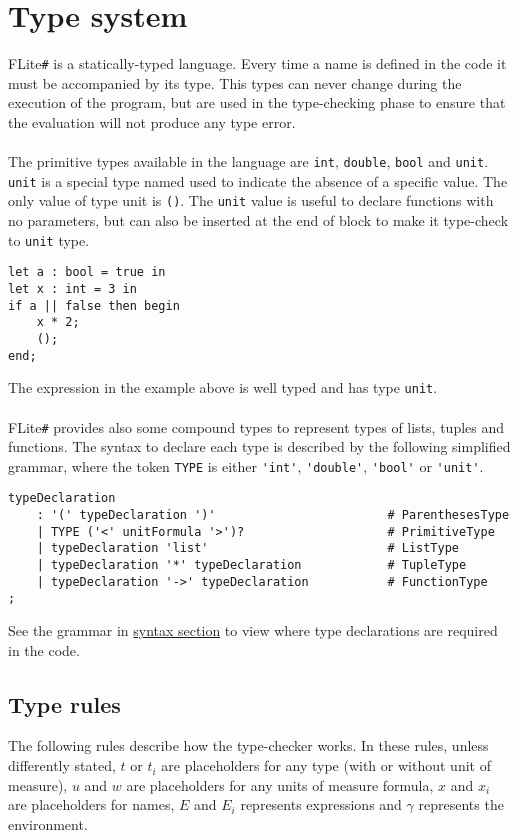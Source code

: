 \documentclass[]{article}
\begin{document}
	\section{Type system}
	\label{sec:typeSystem}
		FLite\verb|#| is a statically-typed language. Every time a name is defined in the code it must be accompanied by its type. This types can never change during the execution of the program, but are used in the type-checking phase to ensure that the evaluation will not produce any type error.\\\\
		The primitive types available in the language are \lstinline|int|, \lstinline|double|, \lstinline|bool| and \lstinline|unit|. \lstinline|unit| is a special type named used to indicate the absence of a specific value. The only value of type unit is \lstinline|()|. The \lstinline|unit| value is useful to declare functions with no parameters, but can also be inserted at the end of block to make it type-check to \lstinline|unit| type.
		\begin{lstlisting}[caption={Conditional expression}, label=CondExpr]
let a : bool = true in
let x : int = 3 in
if a || false then begin
	x * 2;
	();
end;
		\end{lstlisting}
		The expression in the example above is well typed and has type \lstinline|unit|.\\\\
		FLite\verb|#| provides also some compound types to represent types of lists, tuples and functions. The syntax to declare each type is described by the following simplified grammar, where the token \lstinline|TYPE| is either \lstinline|'int'|, \lstinline|'double'|, \lstinline|'bool'| or \lstinline|'unit'|.
		\begin{lstlisting}[caption={Type declarations grammar}, label=typeGrammar]
typeDeclaration
	: '(' typeDeclaration ')'                        # ParenthesesType
	| TYPE ('<' unitFormula '>')?                    # PrimitiveType
	| typeDeclaration 'list'                         # ListType
	| typeDeclaration '*' typeDeclaration            # TupleType
	| typeDeclaration '->' typeDeclaration           # FunctionType
;
		\end{lstlisting}
		See the grammar in \hyperref[sec:syntax]{syntax section} to view where type declarations are required in the code.
		\subsection{Type rules}
		The following rules describe how the type-checker works. In these rules, unless differently stated, $t$ or $t_i$ are placeholders for any type (with or without unit of measure), $u$ and $w$ are placeholders for any units of measure formula, $x$ and $x_i$ are placeholders for names, $E$ and $E_i$ represents expressions and $\gamma$ represents the environment.
		
\end{document}
